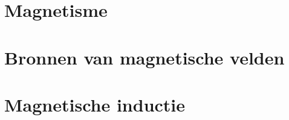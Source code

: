 \section{Magnetisme}

\vspace{0.5cm}



\newpage

\section{Bronnen van magnetische velden}

\vspace{0.5cm}



\newpage

\section{Magnetische inductie}

\vspace{0.5cm}



